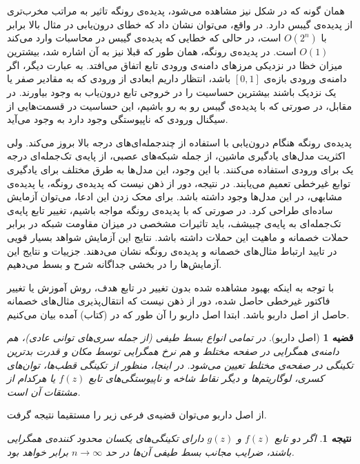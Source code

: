 \documentclass[12pt,onecolumn,a4paper]{article}
\newtheorem{theorem}{قضیه}[section]
\newtheorem{corollary}{نتیجه‌}[theorem]
\begin{document}
همان گونه که در شکل نیز مشاهده می‌شود، پدیده‌ی رونگه تاثیر به مراتب مخرب‌تری از پدیده‌ی گیبس دارد. در واقع، می‌توان نشان داد که خطای درون‌یابی  در مثال بالا برابر با 
$O(2^n‌)$ 
است، در حالی که خطایی که پدیده‌ی گیبس در محاسبات وارد می‌کند 
$O(1)$ 
است. در پدیده‌ی رونگه، همان طور که قبلا نیز به آن اشاره شد، بیشترین میزان خظا در نزدیکی مرزهای دامنه‌ی ورودی تابع اتفاق می‌افتد. به عبارت دیگر، اگر دامنه‌ی ورودی بازه‌ی 
$[0,1]$ 
باشد، انتظار داریم ابعادی از ورودی که به مقادیر صفر یا یک نزدیک باشند بیشترین حساسیت را در خروجی تابع درون‌یاب به وجود بیاورند. در مقابل، در صورتی که با پدیده‌ی گیبس رو به رو باشیم، این حساسیت در قسمت‌هایی از سیگنال ورودی که ناپیوستگی وجود دارد به وجود می‌آید.

پدیده‌ی رونگه هنگام درون‌یابی با استفاده از چندجمله‌ای‌های درجه بالا بروز می‌کند. ولی اکثریت مدل‌های یادگیری ماشین، از جمله شبکه‌های عصبی، از پایه‌ی تک‌جمله‌ای درجه یک برای ورودی استفاده می‌کنند. با این وجود، این مدل‌ها به طرق مختلف برای یادگیری توابع غیرخطی تعمیم می‌یابند. در نتیجه، دور از ذهن نیست که پدیده‌ی رونگه، یا پدیده‌ی مشابهی، در این مدل‌ها وجود داشته باشد. برای محک زدن این ادعا، می‌توان آزمایش ساده‌ای طراحی کرد. در صورتی که با پدیده‌ی رونگه مواجه باشیم، تغییر تابع پایه‌ی تک‌جمله‌ای به پایه‌ی چبیشف، باید تاثیرات مشخصی در میزان مقاومت شبکه در برابر حملات خصمانه و ماهیت این حملات داشته باشد. نتایج این آزمایش شواهد بسیار قویی در تایید ارتباط مثال‌های خصمانه و پدیده‌ی رونگه نشان می‌دهند. جزییات و نتایج این آزمایش‌ها را در بخشی جداگانه شرح و بسط می‌دهیم.

با توجه به اینکه بهبود مشاهده شده بدون تغییر در تابع هدف، روش آموزش یا تغییر فاکتور غیرخطی حاصل شده، دور از ذهن نیست که انتقال‌پذیری مثال‌های خصمانه حاصل از اصل داربو باشد. ابتدا اصل داربو را آن طور که در (کتاب) آمده بیان می‌کنیم.
\begin{theorem}[اصل داربو]
    در تمامی انواع بسط طیفی (از جمله سری‌های توانی عادی)، هم دامنه‌ی همگرایی در صفحه مختلط و هم نرخ همگرایی توسط مکان و قدرت بدترین تکینگی در صفحه‌ی مختلط تعیین می‌شود. در اینجا، منظور از تکینگی قطب‌ها، توان‌های کسری، لوگاریتم‌ها و دیگر نقاط شاخه و ناپیوستگی‌های تابع 
    $f(z)$ 
    یا هرکدام از مشتقات آن است.
\end{theorem}

از اصل داربو می‌توان قضیه‌ی فرعی زیر را مستقیما نتیجه گرفت.

\begin{corollary}
    اگر دو تابع 
    $f(z)$ 
    و 
    $g(z)$ 
    دارای تکینگی‌های یکسان محدود کننده‌ی همگرایی باشند، ضرایب مجانب بسط طیفی آن‌ها در حد
    $n \rightarrow \infty$ 
    برابر خواهد بود.
\end{corollary}
\end{document}
